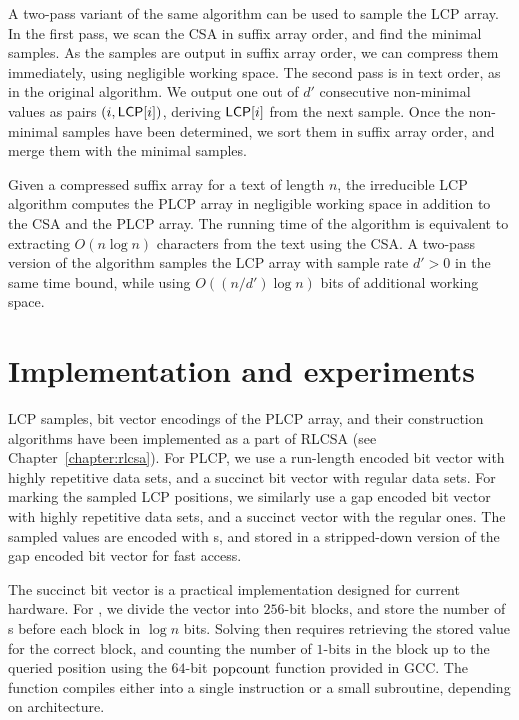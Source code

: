 A two-pass variant of the same algorithm can be used to sample the LCP array. In the first pass, we scan the CSA in suffix array order, and find the minimal samples. As the samples are output in suffix array order, we can compress them immediately, using negligible working space. The second pass is in text order, as in the original algorithm. We output one out of $d'$ consecutive non-minimal values as pairs $(i, \mathsf{LCP}[i])$, deriving $\mathsf{LCP}[i]$ from the next sample. Once the non-minimal samples have been determined, we sort them in suffix array order, and merge them with the minimal samples.

\begin{theorem}\label{theorem:irreducible lcp algorithm}
Given a compressed suffix array for a text of length $n$, the irreducible LCP algorithm computes the PLCP array in negligible working space in addition to the CSA and the PLCP array. The running time of the algorithm is equivalent to extracting $O(n \log n)$ characters from the text using the CSA. A two-pass version of the algorithm samples the LCP array with sample rate $d' > 0$ in the same time bound, while using $O((n/d') \log n)$ bits of additional working space.
\end{theorem}
\newpage


\section{Implementation and experiments}\label{sect:lcp experiments}

LCP samples, bit vector encodings of the PLCP array, and their construction algorithms have been implemented as a part of RLCSA (see Chapter~\ref{chapter:rlcsa}). For PLCP, we use a run-length encoded bit vector with highly repetitive data sets, and a succinct bit vector with regular data sets. For marking the sampled LCP positions, we similarly use a gap encoded bit vector with highly repetitive data sets, and a succinct vector with the regular ones. The sampled values are encoded with \deltacode{}s, and stored in a stripped-down version of the gap encoded bit vector for fast access.

The succinct bit vector is a practical implementation designed for current hardware. For \rank, we divide the vector into $256$\nobreakdash-bit blocks, and store the number of \onebit{}s before each block in $\log n$ bits. Solving \rank{} then requires retrieving the stored value for the correct block, and counting the number of $1$-bits in the block up to the queried position using the $64$-bit $\operatorname{popcount}$ function provided in GCC. The function compiles either into a single instruction or a small subroutine, depending on architecture.


